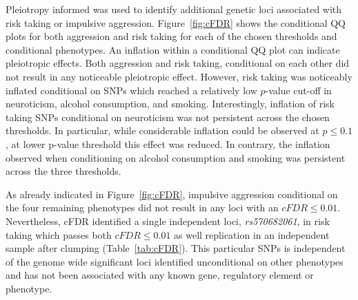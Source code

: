 Pleiotropy informed  was used to identify additional genetic loci associated with risk taking or impulsive aggression.
Figure~\ref{fig:cFDR} shows the conditional QQ plots for both aggression and risk taking for each of the chosen thresholds and conditional phenotypes.
An inflation within a conditional QQ plot can indicate pleiotropic effects.
Both aggression and risk taking, conditional on each other did not result in any noticeable pleiotropic effect.
However, risk taking was noticeably inflated conditional on SNPs which reached a relatively low $p$-value cut-off in neuroticism, alcohol consumption, and smoking.
Interestingly, inflation of risk taking SNPs conditional on neuroticism was not persistent across the chosen thresholds.
In particular, while considerable inflation could be observed at $p\leq0.1$, at lower p-value threshold this effect was reduced.
In contrary, the inflation observed when conditioning on alcohol consumption and smoking was persistent across the three thresholds.

As already indicated in Figure~\ref{fig:cFDR}, impulsive aggression conditional on the four remaining phenotypes did not result in any loci with an $cFDR\leq0.01$.
Nevertheless, cFDR identified a single independent loci, \textit{rs570682061}, in risk taking which passes both $cFDR\leq0.01$ as well replication in an independent sample after clumping (Table~\ref{tab:cFDR}).
This particular SNPs is independent of the genome wide significant loci identified unconditional on other phenotypes and has not been associated with any known gene, regulatory element or phenotype.

